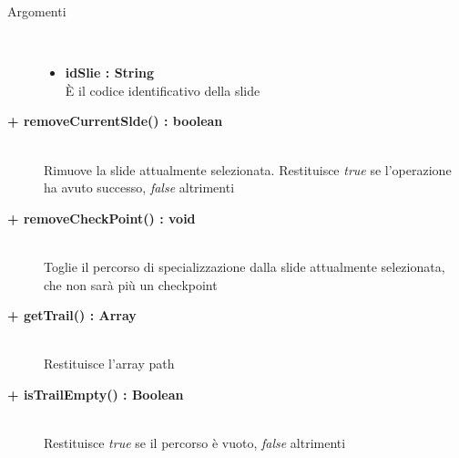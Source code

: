 \begin{description}
\begin{description}
		\begin{description}
			\item[Argomenti] \hfill \\
				\begin{itemize}
				
					\item \textbf{idSlie : String	} \hfill \\
					È il codice identificativo della slide
					
				\end{itemize}
			
		\end{description}
			
	\end{description}
	
	\begin{description}
		\item[\textbf{\color{blue}+ removeCurrentSlde() : boolean			}] \hfill \\
			Rimuove la slide attualmente selezionata. Restituisce \textit{true} se l'operazione ha avuto successo, \textit{false} altrimenti 
			
	\end{description}
	
	\begin{description}
		\item[\textbf{\color{blue}+ removeCheckPoint() : void			}] \hfill \\
			Toglie il percorso di specializzazione dalla slide attualmente selezionata, che non sarà più un checkpoint
			
	\end{description}
	
	\begin{description}
		\item[\textbf{\color{blue}+ getTrail() : Array			}] \hfill \\
			Restituisce l'array path
			
	\end{description}
	
	\begin{description}
		\item[\textbf{\color{blue}+ isTrailEmpty() : Boolean			}] \hfill \\
			Restituisce \textit{true} se il percorso è vuoto, \textit{false} altrimenti
			
	\end{description}
	
	

\end{description}





























